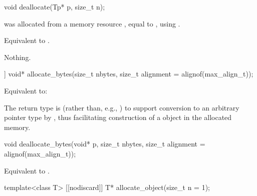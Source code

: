 %
\begin{itemdecl}
void deallocate(Tp* p, size_t n);
\end{itemdecl}

\begin{itemdescr}
\pnum
\expects
{} was allocated from a memory resource ,
equal to ,
using .

\pnum
\effects
Equivalent to .

\pnum
\throws
Nothing.
\end{itemdescr}

%
\begin{itemdecl}
[[nodiscard]] void* allocate_bytes(size_t nbytes, size_t alignment = alignof(max_align_t));
\end{itemdecl}

\begin{itemdescr}
\pnum
\effects
Equivalent to: 

\pnum
\begin{note}
The return type is  (rather than, e.g., )
to support conversion to an arbitrary pointer type 
by , thus facilitating construction of a 
object in the allocated memory.
\end{note}
\end{itemdescr}

%
\begin{itemdecl}
void deallocate_bytes(void* p, size_t nbytes, size_t alignment = alignof(max_align_t));
\end{itemdecl}

\begin{itemdescr}
\pnum
\effects
Equivalent to .
\end{itemdescr}

%
\begin{itemdecl}
template<class T>
  [[nodiscard]] T* allocate_object(size_t n = 1);
\end{itemdecl}

